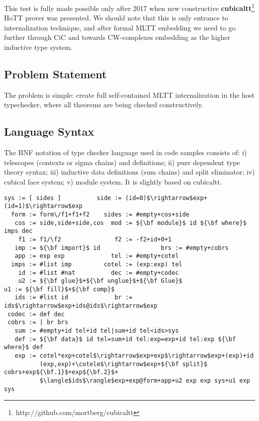 \documentclass[twoside]{article}
\theoremstyle{definition}
\begin{document}
This test is fully made possible only after 2017 when new constructive
{\bf cubicaltt}\footnote{http://github.com/mortberg/cubicaltt} HoTT\cite{HoTT13}
prover was presented\cite{Mortberg17}. We should note that this is only entrance
to internalization technique, and after formal MLTT embedding we
need to go further through CiC\cite{Pfenning89,Dybjer94} and towards CW-complexes
embedding as the higher inductive type system.

\subsection*{Problem Statement}

The problem is simple: create full self-contained MLTT internalization in the host typechecker,
where all theorems are being checked constructively.

\subsection*{Language Syntax}

The BNF notation of type checker language used in code samples consists of:
i) telescopes (contexts or sigma chains) and definitions;
ii) pure dependent type theory syntax;
iii) inductive data definitions (sum chains) and split eliminator;
iv) cubical face system;
v) module system. It is slightly based on cubicaltt.

\begin{lstlisting}[mathescape=true]
   sys := [ sides ]          side := (id=0)$\rightarrow$exp+(id=1)$\rightarrow$exp
  form := form\/f1+f1+f2    sides := #empty+cos+side
   cos := side,side+side,cos  mod := ${\bf module}$ id ${\bf where}$ imps dec
    f1 := f1/\f2               f2 := -f2+id+0+1
   imp := ${\bf import}$ id                 brs := #empty+cobrs
   app := exp exp             tel := #empty+cotel
  imps := #list imp         cotel := (exp:exp) tel
    id := #list #nat          dec := #empty+codec
    u2 := ${\bf glue}$+${\bf unglue}$+${\bf Glue}$                   u1 := ${\bf fill}$+${\bf comp}$
   ids := #list id             br := ids$\rightarrow$exp+ids@ids$\rightarrow$exp
 codec := def dec
 cobrs := | br brs
   sum := #empty+id tel+id tel|sum+id tel<ids>sys   
   def := ${\bf data}$ id tel=sum+id tel:exp=exp+id tel:exp ${\bf where}$ def
   exp := cotel*exp+cotel$\rightarrow$exp+exp$\rightarrow$exp+(exp)+id
          (exp,exp)+\cotele$\rightarrow$exp+${\bf split}$ cobrs+exp${\bf.1}$+exp${\bf.2}$+
          $\langle$ids$\rangle$exp+exp@form+app+u2 exp exp sys+u1 exp sys
\end{lstlisting}
\end{document}

